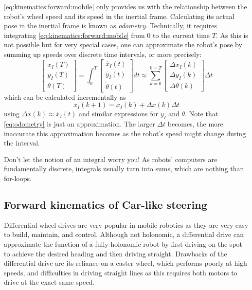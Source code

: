\cref{eq:kinematics:forward:mobile} only provides us with the relationship between the robot's wheel speed and its speed in the inertial frame.
Calculating its actual pose in the inertial frame is known as \textsl{odometry}. Technically, it requires integrating \cref{eq:kinematics:forward:mobile} from 0 to the current time $T$.
As this is not possible but for very special cases, one can approximate the robot's pose by summing up speeds over discrete time intervals, or more precisely:
\begin{equation}
\left[\begin{array}{c} {x_I}(T)\\{y_I}(T)\\{\theta}(T)\end{array}\right]=
\int_0^T \left[\begin{array}{c} \dot{x_I}(t)\\\dot{y_I}(t)\\\dot{\theta}(t)\end{array}\right] dt \approx
\sum_{k=0}^{k=T}\left[\begin{array}{c} \Delta{x_I}(k)\\\Delta{y_I}(k)\\\Delta{\theta}(k)\end{array}\right]\Delta t
\end{equation} which can be calculated incrementally as
\begin{equation}\label{eq:odometry}
x_I(k+1)=x_I(k)+\Delta x (k) \Delta t
\end{equation}
using $\Delta x(k) \approx \dot{x_I}(t)$ and similar expressions for $y_I$ and $\theta$. Note that \cref{eq:odometry} is just an approximation. The larger $\Delta t$ becomes, the more inaccurate this approximation becomes as the robot's speed might change during the interval.

\begin{mdframed}
\noindent Don't let the notion of an integral worry you! As robots' computers are fundamentally discrete, integrals usually turn into sums, which are nothing than for-loops.
\end{mdframed}

\subsection{Forward kinematics of Car-like steering}\label{sec:kinematics:fwk:car}

Differential wheel drives are very popular in mobile robotics as they are very easy to build, maintain, and control.
Although not holonomic, a differential drive can approximate the function of a fully holonomic robot by first driving on the spot to achieve the desired heading and then driving straight.
Drawbacks of the differential drive are its reliance on a caster wheel, which performs poorly at high speeds, and difficulties in driving straight lines as this requires both motors to drive at the exact same speed.

